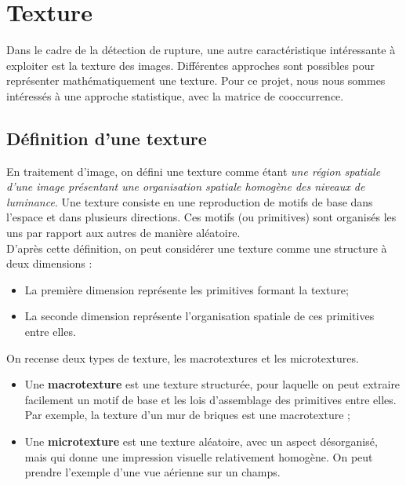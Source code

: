 \section{Texture}

Dans le cadre de la détection de rupture, une autre caractéristique intéressante à exploiter est la texture des images. Différentes approches sont possibles pour représenter mathématiquement une texture. Pour ce projet, nous nous sommes intéressés à une approche statistique, avec la matrice de cooccurrence.

\subsection{Définition d'une texture}

En traitement d'image, on défini une texture comme étant \textit{une région spatiale d'une image présentant une organisation spatiale homogène des niveaux de luminance}. Une texture consiste en une reproduction de motifs de base dans l'espace et dans plusieurs directions. Ces motifs (ou primitives) sont organisés les uns par rapport aux autres de manière aléatoire.\\

D'après cette définition, on peut considérer une texture comme une structure à deux dimensions :

\begin{itemize}
    \item La première dimension représente les primitives formant la texture;
    \item La seconde dimension représente l'organisation spatiale de ces primitives entre elles.
\end{itemize}

On recense deux types de texture, les macrotextures et les microtextures.

\begin{itemize}
    \item Une \textbf{macrotexture} est une texture structurée, pour laquelle on peut extraire facilement un motif de base et les lois d'assemblage des primitives entre elles. Par exemple, la texture d'un mur de briques est une macrotexture ;
    \item Une \textbf{microtexture} est une texture aléatoire, avec un aspect désorganisé, mais qui donne une impression visuelle relativement homogène. On peut prendre l'exemple d'une vue aérienne sur un champs.
\end{itemize}

